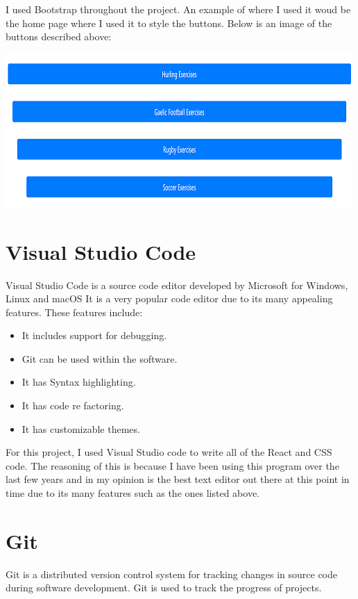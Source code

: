 I used Bootstrap throughout the project. An example of where I used it woud be the home page where I used it to style the buttons. Below is an image of the buttons described above:

\begin{center}    
\includegraphics{img/button.png}
\end{center}

\section{Visual Studio Code}
Visual Studio Code is a source code editor developed by Microsoft for Windows, Linux and macOS\cite{Visual} It is a very popular code editor due to its many appealing features. These features include:

\begin{itemize}
\item It includes support for debugging.
\item Git can be used within the software.
\item It has Syntax highlighting.
\item It has code re factoring.
\item It has customizable themes.
\end{itemize}

For this project, I used Visual Studio code to write all of the React and CSS code. The reasoning of this is because I have been using this program over the last few years and in my opinion is the best text editor out there at this point in time due to its many features such as the ones listed above.

\section{Git}
Git is a distributed version control system for tracking changes in source code during software development\cite{Git}. Git is used to track the progress of projects. 

